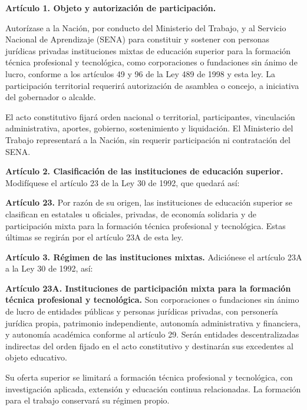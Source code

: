 \begin{mdframed}[linewidth=0.6pt,linecolor=gray!60,backgroundcolor=gray!3,
  innertopmargin=10pt,innerbottommargin=10pt,innerleftmargin=10pt,innerrightmargin=10pt]
\textbf{Artículo 1. Objeto y autorización de participación.}

Autorízase a la Nación, por conducto del Ministerio del Trabajo, y al Servicio Nacional de Aprendizaje (SENA) para constituir y sostener con personas jurídicas privadas instituciones mixtas de educación superior para la formación técnica profesional y tecnológica, como corporaciones o fundaciones sin ánimo de lucro, conforme a los artículos 49 y 96 de la Ley 489 de 1998 y esta ley. La participación territorial requerirá autorización de asamblea o concejo, a iniciativa del gobernador o alcalde.

El acto constitutivo fijará orden nacional o territorial, participantes, vinculación administrativa, aportes, gobierno, sostenimiento y liquidación. El Ministerio del Trabajo representará a la Nación, sin requerir participación ni contratación del SENA.

\textbf{Artículo 2. Clasificación de las instituciones de educación superior.} Modifíquese el artículo 23 de la Ley 30 de 1992, que quedará así:

\textbf{Artículo 23.} Por razón de su origen, las instituciones de educación superior se clasifican en estatales u oficiales, privadas, de economía solidaria y de participación mixta para la formación técnica profesional y tecnológica. Estas últimas se regirán por el artículo 23A de esta ley.

\textbf{Artículo 3. Régimen de las instituciones mixtas.} Adiciónese el artículo 23A a la Ley 30 de 1992, así:

\textbf{Artículo 23A. Instituciones de participación mixta para la formación técnica profesional y tecnológica.} Son corporaciones o fundaciones sin ánimo de lucro de entidades públicas y personas jurídicas privadas, con personería jurídica propia, patrimonio independiente, autonomía administrativa y financiera, y autonomía académica conforme al artículo 29. Serán entidades descentralizadas indirectas del orden fijado en el acto constitutivo y destinarán sus excedentes al objeto educativo.

Su oferta superior se limitará a formación técnica profesional y tecnológica, con investigación aplicada, extensión y educación continua relacionadas. La formación para el trabajo conservará su régimen propio.


\end{mdframed}
